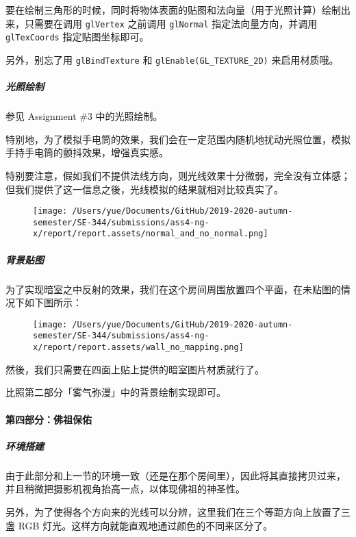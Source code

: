\documentclass[
]{article}
\begin{document}
要在绘制三角形的时候，同时将物体表面的贴图和法向量（用于光照计算）绘制出来，只需要在调用
\texttt{glVertex} 之前调用 \texttt{glNormal} 指定法向量方向，并调用
\texttt{glTexCoords} 指定贴图坐标即可。

另外，别忘了用 \texttt{glBindTexture} 和
\texttt{glEnable(GL\_TEXTURE\_2D)} 来启用材质哦。

\hypertarget{header-n232}{%
\subparagraph{光照绘制}\label{header-n232}}

参见 Assignment \#3 中的光照绘制。

特别地，为了模拟手电筒的效果，我们会在一定范围内随机地扰动光照位置，模拟手持手电筒的颤抖效果，增强真实感。

特别要注意，假如我们不提供法线方向，则光线效果十分微弱，完全没有立体感；但我们提供了这一信息之後，光线模拟的结果就相对比较真实了。

\begin{figure}
\centering
\texttt{[image: /Users/yue/Documents/GitHub/2019-2020-autumn-semester/SE-344/submissions/ass4-ng-x/report/report.assets/normal\_and\_no\_normal.png]}
\caption{}
\end{figure}

\hypertarget{header-n237}{%
\subparagraph{背景贴图}\label{header-n237}}

为了实现暗室之中反射的效果，我们在这个房间周围放置四个平面，在未贴图的情况下如下图所示：

\begin{figure}
\centering
\texttt{[image: /Users/yue/Documents/GitHub/2019-2020-autumn-semester/SE-344/submissions/ass4-ng-x/report/report.assets/wall\_no\_mapping.png]}
\caption{}
\end{figure}

然後，我们只需要在四面上贴上提供的暗室图片材质就行了。

比照第二部分「雾气弥漫」中的背景绘制实现即可。

\hypertarget{header-n242}{%
\paragraph{第四部分：佛祖保佑}\label{header-n242}}

\hypertarget{header-n243}{%
\subparagraph{环境搭建}\label{header-n243}}

由于此部分和上一节的环境一致（还是在那个房间里），因此将其直接拷贝过来，并且稍微把摄影机视角抬高一点，以体现佛祖的神圣性。

另外，为了使得各个方向来的光线可以分辨，这里我们在三个等距方向上放置了三盏
RGB 灯光。这样方向就能直观地通过颜色的不同来区分了。
\end{document}
